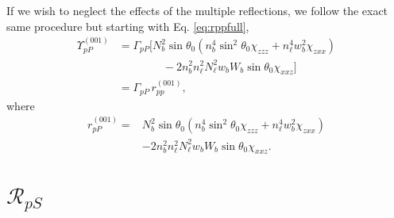 If we wish to neglect the effects of the multiple reflections, we follow the
exact same procedure but starting with Eq. \eqref{eq:rppfull},
\begin{equation*}
\begin{split}
\Upsilon^{(001)}_{pP} &=
\Gamma_{pP}
\big[
N^{2}_{b}\sin\theta_{0}(n^{4}_{b}\sin^{2}\theta_{0}\chi_{zzz}
+ n^{4}_{\ell}w^{2}_{b}\chi_{zxx})\\
&\qquad\qquad- 2n^{2}_{b}n^{2}_{\ell}N^{2}_{\ell}w_{b}W_{b}\sin\theta_{0}
\chi_{xxz}
\big]\\
&= \Gamma_{pP}\,r^{(001)}_{pp},
\end{split}
\end{equation*}
where
\begin{equation}\label{eq:final-rpp.001}
\begin{split}
r^{(001)}_{pP} = 
&N^{2}_{b}\sin\theta_{0}(n^{4}_{b}\sin^{2}\theta_{0}\chi_{zzz}
+ n^{4}_{\ell}w^{2}_{b}\chi_{zxx})\\
&- 2n^{2}_{b}n^{2}_{\ell}N^{2}_{\ell}w_{b}W_{b}\sin\theta_{0}\chi_{xxz}.
\end{split}
\end{equation}




\section{\texorpdfstring{$\mathcal{R}_{pS}$}{RpS}}

